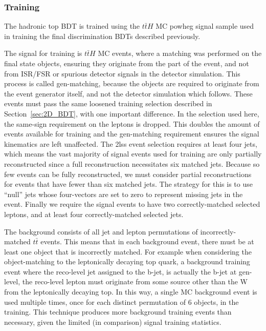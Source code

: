 \subsubsection{Training}
The hadronic top BDT is trained using the $t\bar{t}H$ MC powheg
signal sample used in training the final discrimination BDTs described previously.

The signal for training is $t\bar{t}H$ MC events, where a matching was performed on the final state objects, ensuring
they originate from the \tth part of the event, and not from ISR/FSR or spurious detector signals in the detector simulation. This process
is called gen-matching, because the objects are required to originate from the event generator itself, and not the detector simulation which
follows. These events must pass the same loosened training selection
described in Section~\ref{sec:2D_BDT}, with one important difference. In the selection used
here, the same-sign requirement on the leptons is dropped. This doubles the amount of events available
for training and the gen-matching requirement ensures the signal kinematics are left unaffected. 
The 2lss event selection requires at least four jets, which means the vast majority of signal
events used for training are only partially reconstructed since a full reconstruction
necessitates six matched jets. Because so few events can be fully reconstructed, we must
consider partial reconstructions for events that have fewer than six matched jets.
The strategy for this is to use ``null'' jets whose four-vectors are set to zero to
represent missing jets in the event. Finally we require the signal events to have two
correctly-matched selected leptons, and at least four correctly-matched selected jets.

The background consists of all jet and lepton permutations of incorrectly-matched
$t\bar{t}$ events. This means that in each background event, there must be at least one
object that is incorrectly matched. For example when considering the object-matching to the
leptonically decaying top quark, a background training event where the reco-level jet assigned
to the b-jet, is actually the b-jet at gen-level, the reco-level lepton must originate from some source
other than the W from the leptonically decaying top. In this way, a single \ttbar MC
background event is used multiple times, once for each distinct permutation of 6 objects, in the training.
This technique produces more background training events than necessary, given the limited (in comparison)
signal training statistics.

